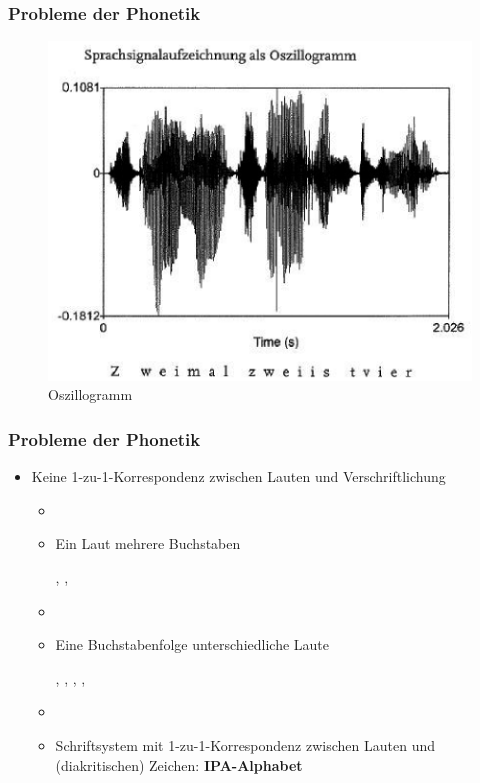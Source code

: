 \begin{frame}
\frametitle{Probleme der Phonetik}

	\begin{figure}[H]
		\centering
		
		\includegraphics[scale=0.65]{material/04oszillogrammwiese}
		\caption{Oszillogramm \citep{WieseR11a}}
	\end{figure}	
	
\end{frame}



\begin{frame}
\frametitle{Probleme der Phonetik}

	\begin{itemize}
		\item Keine 1-zu-1-Korrespondenz zwischen Lauten und Verschriftlichung
		
		\begin{itemize}
			\item[]
			\item Ein Laut \ras mehrere Buchstaben

			\ea \textipa{[s]} \ras {}, , 
			\z
			
			\item[]
			\item Eine Buchstabenfolge \ras unterschiedliche Laute

			\ea {} \ras {}, , , , 
			\z

			\item[]
			\item[\ras] Schriftsystem mit 1-zu-1-Korrespondenz zwischen Lauten und (diakritischen) Zeichen: \textbf{IPA-Alphabet}
		\end{itemize}
		
	\end{itemize}
	
\end{frame}


